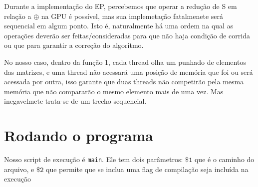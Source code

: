 \documentclass[11pt]{article}
\begin{document}
Durante a implementação do EP, percebemos que operar a redução de S em relação a $\oplus$ na GPU é possível, mas sua implemetação fatalmenete será sequencial em algum ponto. Isto é, naturalmente há uma ordem na qual as operações deverão ser feitas/consideradas para que não haja condição de corrida ou que para garantir a correção do algoritmo.

No nosso caso, dentro da função 1, cada thread olha um punhado de elementos das matrizes, e uma thread não acessará uma posição de memória que foi ou será acessada por outra, isso garante que duas threads não competirão pela mesma memória que não compararão o mesmo elemento mais de uma vez. Mas inegavelmete trata-se de um trecho sequencial.

\section{Rodando o programa}

Nosso script de execução é \texttt{main}. Ele tem dois parâmetros: $\mathtt{\$1}$ que é o caminho do arquivo, e $\mathtt{\$2}$ que permite que se inclua uma flag de compilação seja incluída na execução
\end{document}
